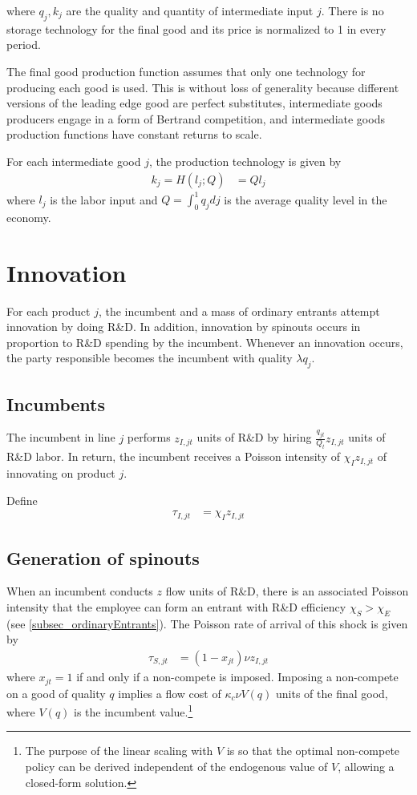 \documentclass[12pt,english]{article}
\theoremstyle{remark}
\begin{document}
where $q_j,k_j$ are the quality and quantity of intermediate input $j$. 
There is no storage technology for the final good and its price is normalized to 1 in every period. 

The final good production function assumes that only one technology for producing each good is used. This is without loss of generality because different versions of the leading edge good are perfect substitutes, intermediate goods producers engage in a form of Bertrand competition, and intermediate goods production functions have constant returns to scale. 

For each intermediate good $j$, the production technology is given by
\begin{align*}
k_j = H(l_j;Q) &= Q l_j
\end{align*}
where $l_j$ is the labor input and $Q = \int_0^1 q_j dj$ is the average quality level in the economy. 

\section{Innovation}

For each product $j$, the incumbent and a mass of ordinary entrants attempt innovation by doing R\&D. In addition, innovation by spinouts occurs in proportion to R\&D spending by the incumbent. Whenever an innovation occurs, the party responsible becomes the incumbent with quality $\lambda q_j$. 

\subsection{Incumbents}

The incumbent in line $j$ performs $z_{I,jt}$ units of R\&D by hiring $\frac{q_{jt}}{Q_t}z_{I,jt}$ units of R\&D labor. In return, the incumbent receives a Poisson intensity of $\chi_I z_{I,jt}$ of innovating on product $j$. 

Define
\begin{align}
	\tau_{I,jt} &= \chi_I z_{I,jt}
\end{align}


\subsection{Generation of spinouts}

When an incumbent conducts $z$ flow units of R\&D, there is an associated Poisson intensity that the employee can form an entrant with R\&D efficiency $\chi_S > \chi_E$ (see  \ref{subsec_ordinaryEntrants}). The Poisson rate of arrival of this shock is given by 
\begin{align*}
	\tau_{S,jt} &= (1-x_{jt}) \nu z_{I,jt}
\end{align*} 
where $x_{jt} = 1$ if and only if a non-compete is imposed. Imposing a non-compete on a good of quality $q$ implies a flow cost of $\kappa_{c} \nu V(q)$ units of the final good, where $V(q)$ is the incumbent value.\footnote{The purpose of the linear scaling with $V$ is so that the optimal non-compete policy can be derived independent of the endogenous value of $V$, allowing a closed-form solution.}
\end{document}
